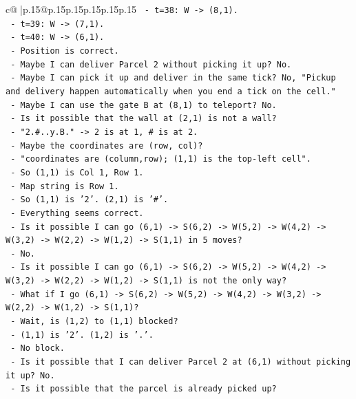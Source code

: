 \documentclass{article}
\begin{document}
{\begin{supertabular}{c@{$\;$}|p{.15\linewidth}@{}p{.15\linewidth}p{.15\linewidth}p{.15\linewidth}p{.15\linewidth}p{.15\linewidth}}
{{{\texttt{      {-} t=38: W {-}> (8,1).} \\
\texttt{      {-} t=39: W {-}> (7,1).} \\
\texttt{      {-} t=40: W {-}> (6,1).} \\
\texttt{      {-} Position is correct.} \\
\texttt{      {-} Maybe I can deliver Parcel 2 without picking it up? No.} \\
\texttt{      {-} Maybe I can pick it up and deliver in the same tick? No, "Pickup and delivery happen automatically when you end a tick on the cell."} \\
\texttt{      {-} Maybe I can use the gate B at (8,1) to teleport? No.} \\
\texttt{      {-} Is it possible that the wall at (2,1) is not a wall?} \\
\texttt{      {-} "2.\#..y.B." {-}> 2 is at 1, \# is at 2.} \\
\texttt{      {-} Maybe the coordinates are (row, col)?} \\
\texttt{      {-} "coordinates are (column,row); (1,1) is the top{-}left cell".} \\
\texttt{      {-} So (1,1) is Col 1, Row 1.} \\
\texttt{      {-} Map string is Row 1.} \\
\texttt{      {-} So (1,1) is '2'. (2,1) is '\#'.} \\
\texttt{      {-} Everything seems correct.} \\
\texttt{      {-} Is it possible I can go (6,1) {-}> S(6,2) {-}> W(5,2) {-}> W(4,2) {-}> W(3,2) {-}> W(2,2) {-}> W(1,2) {-}> S(1,1) in 5 moves?} \\
\texttt{      {-} No.} \\
\texttt{      {-} Is it possible I can go (6,1) {-}> S(6,2) {-}> W(5,2) {-}> W(4,2) {-}> W(3,2) {-}> W(2,2) {-}> W(1,2) {-}> S(1,1) is not the only way?} \\
\texttt{      {-} What if I go (6,1) {-}> S(6,2) {-}> W(5,2) {-}> W(4,2) {-}> W(3,2) {-}> W(2,2) {-}> W(1,2) {-}> S(1,1)?} \\
\texttt{      {-} Wait, is (1,2) to (1,1) blocked?} \\
\texttt{      {-} (1,1) is '2'. (1,2) is '.'.} \\
\texttt{      {-} No block.} \\
\texttt{      {-} Is it possible that I can deliver Parcel 2 at (6,1) without picking it up? No.} \\
\texttt{      {-} Is it possible that the parcel is already picked up?} \\
}}}
\end{supertabular}}
\end{document}
